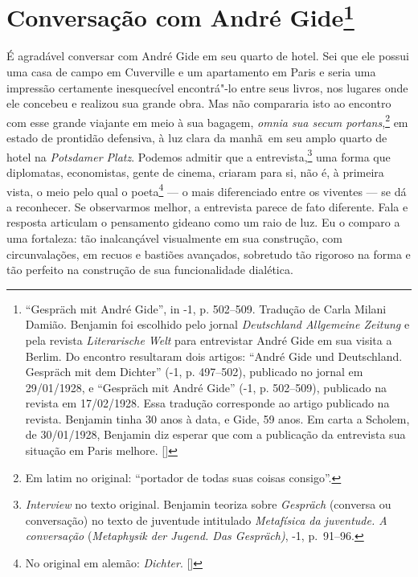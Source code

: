 \chapter{Conversação com André Gide\footnote[*]{``Gespräch mit André Gide'', in -1, p. 502--509. Tradução de Carla Milani Damião. Benjamin
  foi escolhido pelo jornal \emph{Deutschland Allgemeine Zeitung} e pela
  revista \emph{Literarische Welt} para entrevistar André Gide em sua
  visita a Berlim. Do encontro resultaram dois artigos: ``André Gide
  und Deutschland. Gespräch mit dem Dichter'' (-1, p. 497--502),
  publicado no jornal em 29/01/1928, e ``Gespräch mit André Gide''
  (-1, p. 502--509), publicado na revista em 17/02/1928. Essa
  tradução corresponde ao artigo publicado na revista. Benjamin tinha 30
  anos à data, e Gide, 59 anos. Em carta a Scholem, de 30/01/1928,
  Benjamin diz esperar que com a publicação da entrevista sua situação
  em Paris melhore. []}}

É agradável conversar com André Gide em seu quarto de hotel. Sei que ele possui uma casa de campo em Cuverville e um
apartamento em Paris e seria uma impressão certamente inesquecível
encontrá"-lo entre seus livros, nos lugares onde ele concebeu e realizou
sua grande obra. Mas não compararia isto ao encontro com esse grande
viajante em meio à sua bagagem, \emph{omnia sua secum portans},\footnote{Em latim no original: ``portador de todas suas coisas consigo''. \versal{[N.~T.]}} em
estado de prontidão defensiva, à luz clara da manhã~em seu amplo quarto
de hotel na \emph{Potsdamer Platz}. Podemos admitir que a entrevista,\footnote{\emph{Interview} no texto original.
  Benjamin teoriza sobre \emph{Gespräch} (conversa ou conversação) no
  texto de juventude intitulado \emph{Metafísica da juventude. A
  conversação} (\emph{Metaphysik der Jugend. Das Gespräch)},
  -1, p.~91--96. \versal{[N.~T.]}} uma forma que diplomatas, economistas, gente de cinema, criaram
para si, não é, à primeira vista, o meio pelo qual o poeta\footnote{No original em alemão: \emph{Dichter}. []} --- o mais diferenciado entre os viventes --- se dá a
reconhecer. Se observarmos melhor, a entrevista parece de fato
diferente. Fala e resposta articulam o pensamento gideano como um raio
de luz. Eu o comparo a uma fortaleza: tão inalcançável visualmente em
sua construção, com circunvalações, em recuos e bastiões avançados,
sobretudo tão rigoroso na forma e tão perfeito na construção de sua
funcionalidade dialética.

